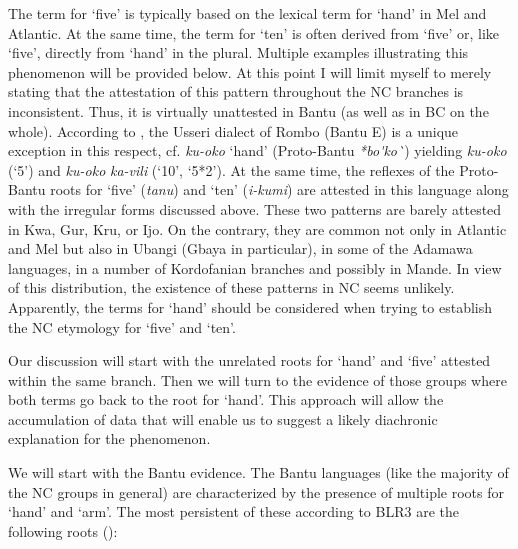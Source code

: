 The term for ‘five’ is typically based on the lexical term for ‘hand’ in Mel and Atlantic. At the same time, the term for ‘ten’ is often derived from ‘five’ or, like ‘five’, directly from ‘hand’ in the plural. Multiple examples illustrating this phenomenon will be provided below. At this point I will limit myself to merely stating that the attestation of this pattern throughout the NC branches is inconsistent. Thus, it is virtually unattested in Bantu (as well as in BC on the whole). According to \citealt{NursePhilippson1975}, the Usseri dialect of Rombo (Bantu E) is a unique exception in this respect, cf. \textit{ku-oko} ‘hand’ (Proto-Bantu \textit{*bo\'{}ko\`{}}) yielding \textit{ku-oko} (‘5’) and \textit{ku-oko} \textit{ka-vili} (‘10’, ‘5*2’). At the same time, the reflexes of the Proto-Bantu roots for ‘five’ (\textit{tanu}) and ‘ten’ (\textit{i-kumi}) are attested in this language along with the irregular forms discussed above. These two patterns are barely attested in Kwa, Gur, Kru, or Ijo. On the contrary, they are common not only in Atlantic and Mel but also in Ubangi (Gbaya in particular), in some of the Adamawa languages, in a number of Kordofanian branches and possibly in Mande. In view of this distribution, the existence of these patterns in NC seems unlikely. Apparently, the terms for ‘hand’ should be considered when trying to establish the NC etymology for ‘five’ and ‘ten’.

Our discussion will start with the unrelated roots for ‘hand’ and ‘five’ attested within the same branch. Then we will turn to the evidence of those groups where both terms go back to the root for ‘hand’. This approach will allow the accumulation of data that will enable us to suggest a likely diachronic explanation for the phenomenon. 

We will start with the Bantu evidence. The Bantu languages (like the majority of the NC groups in general) are characterized by the presence of multiple roots for ‘hand’ and ‘arm’. The most persistent of these according to BLR3 are the following roots ():

